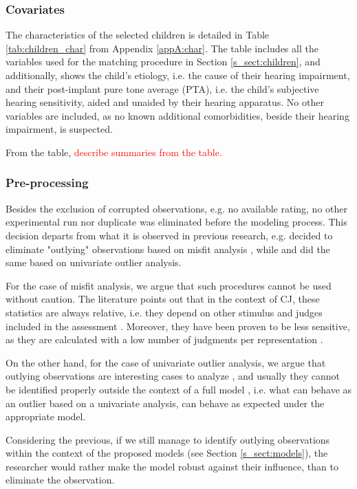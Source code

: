 \subsubsection{Covariates} \label{ss_sect:covariates}
%
The characteristics of the selected children is detailed in Table \ref{tab:children_char} from Appendix \ref{appA:char}. The table includes all the variables used for the matching procedure in Section \ref{s_sect:children}, and additionally, shows the child's etiology, i.e. the cause of their hearing impairment, and their post-implant pure tone average (PTA), i.e. the child's subjective hearing sensitivity, aided and unaided by their hearing apparatus. No other variables are included, as no known additional comorbidities, beside their hearing impairment, is suspected.

From the table, \textcolor{red}{describe summaries from the table.}
%
%
\subsubsection{Pre-processing} \label{ss_sect:preproc}
%
Besides the exclusion of corrupted observations, e.g. no available rating, no other experimental run nor duplicate was eliminated before the modeling process. This decision departs from what it is observed in previous research, e.g. \citet{Boonen_et_al_2020} decided to eliminate "outlying" observations based on misfit analysis \citep{Lesterhuis_2018}, while \citet{vanDaal_2020} and \citet{Boonen_et_al_2021} did the same based on univariate outlier analysis. 

For the case of misfit analysis, we argue that such procedures cannot be used without caution. The literature points out that in the context of CJ, these statistics are always relative, i.e. they depend on other stimulus and judges included in the assessment \citep{Pollitt_2012a, Pollitt_2012b}. Moreover, they have been proven to be less sensitive, as they are calculated with a low number of judgments per representation \citep{Pollitt_2012a}. 

On the other hand, for the case of univariate outlier analysis, we argue that outlying observations are interesting cases to analyze \citep{McElreath_2020}, and usually they cannot be identified properly outside the context of a full model \citep{McElreath_2020}, i.e. what can behave as an outlier based on a univariate analysis, can behave as expected under the appropriate model. 

Considering the previous, if we still manage to identify outlying observations within the context of the proposed models (see Section \ref{s_sect:models}), the researcher would rather make the model robust against their influence, than to eliminate the observation.
%
%
